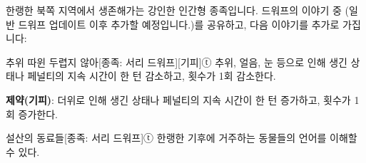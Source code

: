 \documentclass{report}
\begin{document}
	한랭한 북쪽 지역에서 생존해가는 강인한 인간형 종족입니다. 드워프의 이야기 중 (일반 드워프 업데이트 이후 추가할 예정입니다.)를 공유하고, 다음 이야기를 추가로 가집니다:
	
	\begin{story}{추위 따윈 두렵지 않아}{[종족: 서리 드워프][기피]ⓣ}
		추위, 얼음, 눈 등으로 인해 생긴 상태나 페널티의 지속 시간이 한 턴 감소하고, 횟수가 1회 감소한다.
		
		\textbf{제약(기피)}: 더위로 인해 생긴 상태나 페널티의 지속 시간이 한 턴 증가하고, 횟수가 1회 증가한다.
		
	\end{story}
	
	\begin{story}{설산의 동료들}{[종족: 서리 드워프]ⓣ}
		한랭한 기후에 거주하는 동물들의 언어를 이해할 수 있다.
		
	\end{story}
\end{document}
